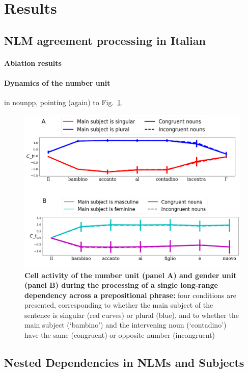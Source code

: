\section{Results}

\subsection{NLM agreement processing in Italian}
\paragraph{Ablation results}
\paragraph{Dynamics of the number unit} in nounpp, pointing (again) to Fig.~\ref{fig:nounpp}.

\begin{figure}
    \centering
    \includegraphics[width=\textwidth]{figures/model_activations_nounpp.png}
    \caption{\textbf{Cell activity of the number unit (panel A) and gender unit (panel B) during the processing of a single long-range dependency across a prepositional phrase:} four conditions are presented, corresponding to whether the main subject of the sentence is singular (red curves) or plural (blue), and to whether the main subject (`bambino') and the intervening noun (`contadino') have the same (congruent) or opposite number (incongruent)}
    \label{fig:nounpp}
\end{figure} 


\subsection{Nested Dependencies in NLMs and Subjects}

